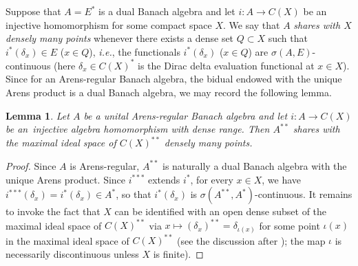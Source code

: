 \documentclass[12pt,fleqn]{amsart}
\newtheorem{lemma}[theorem]{Lemma}
\theoremstyle{definition}
\numberwithin{equation}{section}
\theoremstyle{remark}
\begin{document}
Suppose that $A = E^*$ is a dual Banach algebra and let $i\colon A\to C(X)$ be an injective homomorphism for some compact space $X$. We say that $A$ \emph{shares with $X$ densely many points} whenever there exists a dense set $Q\subset X$ such that $i^*(\delta_x) \in E$ ($x\in Q$), \emph{i.e.}, the functionals $i^*(\delta_x)$ ($x\in Q$) are $\sigma(A,E)$-continuous (here $\delta_x\in C(X)^*$ is the Dirac delta evaluation functional at $x\in X$). Since for an Arens-regular Banach algebra, the bidual endowed with the unique Arens product is a dual Banach algebra, we may record the following lemma.
%
\begin{lemma}\label{l21}
    Let $A$ be a unital Arens-regular Banach algebra and let $i\colon A\to C(X)$ be an~injective algebra homomorphism with dense range. Then $A^{**}$ shares with the maximal ideal space of $C(X)^{**}$ densely many points.
\end{lemma}
%
\begin{proof}
    Since $A$ is Arens-regular, $A^{**}$ is naturally a dual Banach algebra with the unique Arens product. Since $i^{***}$ extends $i^*$, for every $x\in X$, we have $i^{***}(\delta_x) = i^*(\delta_x)\in A^*$, so that $i^*(\delta_x)$ is $\sigma(A^{**}, A^*)$-continuous. It remains to invoke the fact that $X$ can be identified with an open dense subset of the maximal ideal space of $C(X)^{**}$ via $x\mapsto (\delta_x)^{**}=\delta_{\iota(x)}$ for some point $\iota(x)$ in the maximal ideal space of $C(X)^{**}$ (see the discussion after \cite[Definition 3.3]{dales2012second}); the map $\iota$ is necessarily discontinuous unless $X$ is finite). 
\end{proof}
\end{document}
